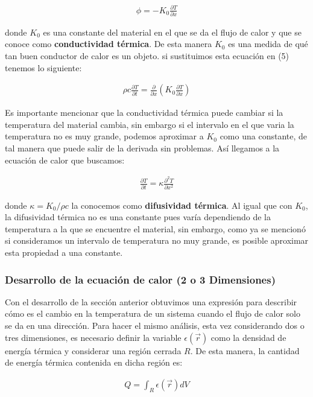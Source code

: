 \documentclass[12pt]{article}
\begin{document}
\begin{align}
    \phi = -K_0\frac{\partial T}{\partial x}
\end{align}

donde $K_0$ es una constante del material en el que se da el flujo de calor y que se conoce como \textbf{conductividad térmica}. De esta manera $K_0$ es una medida de qué tan buen conductor de calor es un objeto. si sustituimos esta ecuación en (5) tenemos lo siguiente:

\begin{align*}
    \rho c\frac{\partial T}{\partial t} = \frac{\partial }{\partial x}\left( K_0\frac{\partial T}{\partial x} \right)
\end{align*}

Es importante mencionar que la conductividad térmica puede cambiar si la temperatura del material cambia, sin embargo si el intervalo en el que varia la temperatura no es muy grande, podemos aproximar a $K_0$ como una constante, de tal manera que puede salir de la derivada sin problemas. Así llegamos a la ecuación de calor que buscamos:

\begin{align}
    \frac{\partial T}{\partial t} = \kappa\frac{\partial^2 T}{\partial x^2}
\end{align}

donde $\kappa = K_0/\rho c$ la conocemos como \textbf{difusividad térmica}. Al igual que con $K_0$, la difusividad térmica no es una constante pues varía dependiendo de la temperatura a la que se encuentre el material, sin embargo, como ya se mencionó si consideramos un intervalo de temperatura no muy grande, es posible aproximar esta propiedad a una constante. \\

\subsubsection{Desarrollo de la ecuación de calor (2 o 3 Dimensiones)}

Con el desarrollo de la sección anterior obtuvimos una expresión para describir cómo es el cambio en la temperatura de un sistema cuando el flujo de calor solo se da en una dirección. Para hacer el mismo análisis, esta vez considerando dos o tres dimensiones, es necesario definir la variable $\epsilon (\vec{r})$ como la densidad de energía térmica y considerar una región cerrada $R$. De esta manera, la cantidad de energía térmica contenida en dicha región es:

\begin{align*}
    Q = \int_R \epsilon(\vec{r})dV
\end{align*}
\end{document}

